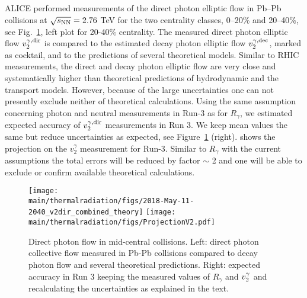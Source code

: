 ALICE performed measurements of the direct photon elliptic flow \cite{Acharya:2018bdy} in Pb--Pb collisions at $\sqrt{s_{\rm NN}}=2.76$ TeV for the two centrality classes, 0--20\% and 20--40\%, see Fig.~\ref{fig:RealPhotonsV2dir}, left plot for 20-40\% centrality.
The measured direct photon elliptic flow $v_2^{\gamma,\rm dir}$ is compared to the estimated decay photon elliptic flow $v_2^{\gamma,\rm dec}$, marked as cocktail, and to the predictions of several theoretical models. Similar to RHIC measurements, the direct and decay photon elliptic flow are very close and systematically higher than theoretical predictions of hydrodynamic  \cite{Gale:2014dfa,Chatterjee:2017akg} and the transport  \cite{Linnyk:2015tha} models. However, because of the large uncertainties  one can not presently exclude neither of theoretical calculations. Using the same assumption concerning photon and neutral measurements in Run-3 as for $R_\gamma$, we estimated expected accuracy of $v_2^{\gamma,\rm dir}$ measurements in Run 3. We keep mean values the same but reduce uncertainties as expected, see Figure~\ref{fig:RealPhotonsV2dir} (right). shows the projection on the $v_2^\gamma$ measurement 
for Run-3. Similar to $R_\gamma$ with the current assumptions the total errors will be reduced by factor $\sim$ 2 and one will be able to exclude or confirm available theoretical calculations.

\begin{figure}[htb]
\centering
\texttt{[image: \\main/thermalradiation/figs/2018-May-11-2040\_v2dir\_combined\_theory]}
\texttt{[image: \\main/thermalradiation/figs/ProjectionV2.pdf]}
\caption{Direct photon flow in mid-central collisions. Left: direct photon collective flow measured in Pb-Pb collisions compared to decay photon flow and several theoretical predictions. Right: expected accuracy in Run 3 keeping the  measured values of $R_\gamma$ and $v_{\rm 2}^\gamma$ and recalculating the uncertainties as explained in the text. }
\label{fig:RealPhotonsV2dir}
\end{figure}




